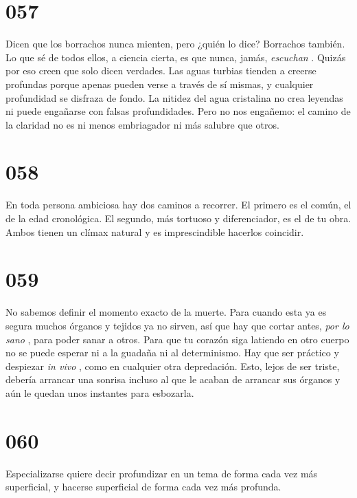 \documentclass[a4paper,11pt,openright,twocolumn]{book}
\begin{document}
\section*{057}

Dicen que los borrachos nunca mienten, pero ¿quién lo dice? Borrachos también. Lo que sé de todos ellos, a ciencia cierta, es que nunca, jamás, {\it escuchan}  . Quizás por eso creen que solo dicen verdades. Las aguas turbias tienden a creerse profundas porque apenas pueden verse a través de sí mismas, y cualquier profundidad se disfraza de fondo. La nitidez del agua cristalina no crea leyendas ni puede engañarse con falsas profundidades. Pero no nos engañemo: el camino de la claridad no es ni menos embriagador ni más salubre que otros. 

\section*{058}

En toda persona ambiciosa hay dos caminos a recorrer. El primero es el común, el de la edad cronológica. El segundo, más tortuoso y diferenciador, es el de tu obra. Ambos tienen un clímax natural y es imprescindible hacerlos coincidir. 

\section*{059}

No sabemos definir el momento exacto de la muerte. Para cuando esta ya es segura muchos órganos y tejidos ya no sirven, así que hay que cortar antes, {\it por lo sano}  , para poder sanar a otros. Para que tu corazón siga latiendo en otro cuerpo no se puede esperar ni a la guadaña ni al determinismo. Hay que ser práctico y despiezar {\it  in vivo}  , como en cualquier otra depredación. Esto, lejos de ser triste, debería arrancar una sonrisa incluso al que le acaban de arrancar sus órganos y aún le quedan unos instantes para esbozarla. 

\section*{060}

Especializarse quiere decir profundizar en un tema de forma cada vez más superficial, y hacerse superficial de forma cada vez más profunda. 
\end{document}
